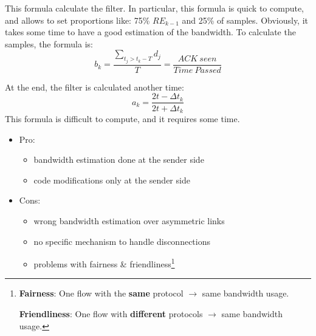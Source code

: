 This formula calculate the filter. In particular, this formula is quick to
compute, and allows to set proportions like: 75\% $RE_{k-1}$ and 25\% of
samples. Obviously, it takes some time to have a good estimation of the
bandwidth.
To calculate the samples, the formula is:
\begin{equation}
b_k = \frac{ \sum_{t_j > t_k-T} d_j }{T} = \frac{ACK\ seen}{Time\ Passed}
\end{equation}

At the end, the filter is calculated another time:
\begin{equation}
a_k = \frac{2t - \Delta t_k}{2t + \Delta t_k}
\end{equation}
This formula is difficult to compute, and it requires some time.
\begin{itemize}
\item Pro:
  \begin{itemize}
    \item bandwidth estimation done at the sender side
    \item code modifications only at the sender side
  \end{itemize}
\item Cons:
  \begin{itemize}
  \item wrong bandwidth estimation over asymmetric links
  \item no specific mechanism to handle disconnections
  \item problems with fairness \& friendliness\footnote{\textbf{Fairness}:
    One flow with the \textbf{same} protocol $\rightarrow$ same
    bandwidth usage.
    
    \textbf{Friendliness}: One flow with \textbf{different} protocols
    $\rightarrow$ same bandwidth usage.}
  \end{itemize}
\end{itemize}
